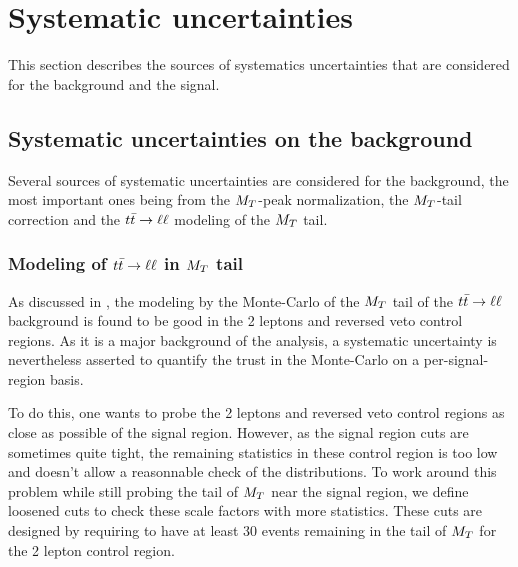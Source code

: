     \section{Systematic uncertainties \label{sec:analysis_systematics}}

        This section describes the sources of systematics uncertainties that are considered for the background and the signal.

        \subsection{Systematic uncertainties on the background \label{sec:background_systematics}}

            Several sources of systematic uncertainties are considered for the background,
            the most important ones being from the $M_T$-peak normalization, the $M_T$-tail
            correction and the $t\bar{t} \rightarrow \ell \ell$ modeling of the $M_T$ tail.

            \subsubsection{Modeling of $t\bar{t} \rightarrow \ell \ell$ in $M_T$ tail}

            As discussed in , the modeling by
            the Monte-Carlo of the $M_T$ tail of the $t\bar{t} \rightarrow \ell \ell$ background is found
            to be good in the 2 leptons and reversed veto control regions. As it is a
            major background of the analysis, a systematic uncertainty is nevertheless
            asserted to quantify the trust in the Monte-Carlo on a per-signal-region basis.

            To do this, one wants to probe the 2 leptons and reversed veto control regions
            as close as possible of the signal region. However, as the signal region cuts
            are sometimes quite tight, the remaining statistics in these control region is
            too low and doesn't allow a reasonnable check of the distributions. To work
            around this problem while still probing the tail of $M_T$ near the signal
            region, we define loosened cuts to check these scale factors with more
            statistics. These cuts are designed by requiring to have at least 30 events
            remaining in the tail of $M_T$ for the 2 lepton control region.

